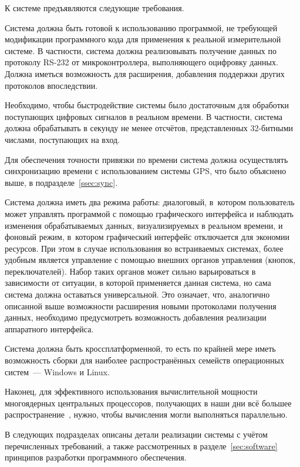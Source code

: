 \documentclass[a4paper, 14pt, titlepage]{extarticle}
\newcommand{\eng}[1]{\foreignlanguage{english}{#1}}
\begin{document}
  К системе предъявляются следующие требования.

  Система должна быть готовой к использованию программой, не требующей модификации программного кода
  для применения к реальной измерительной системе. В частности, система должна реализовывать
  получение данных по протоколу RS-232\cite{sweet-serial} от микроконтроллера, выполняющего оцифровку
  данных. Должна иметься возможность для расширения, добавления поддержки других протоколов впоследствии.

  Необходимо, чтобы быстродействие системы было достаточным для обработки поступающих цифровых
  сигналов в реальном времени. В частности, система должна обрабатывать в секунду не менее
   отсчётов, представленных 32-битными числами, поступающих на вход.

  Для обеспечения точности привязки по времени система должна осуществлять синхронизацию времени с
  использованием системы GPS, что было объяснено выше, в подразделе~\ref{ssec:sync}.

  Система должна иметь два режима работы: диалоговый, в~котором пользователь может управлять
  программой с помощью графического интерфейса и наблюдать изменения обрабатываемых данных,
  визуализируемых в реальном времени, и фоновый режим, в~котором графический интерфейс отключается
  для экономии ресурсов.
  При этом в случае использования во встраиваемых системах, более удобным является управление с
  помощью внешних органов управления (кнопок, переключателей). Набор таких органов может
  сильно варьироваться в зависимости от ситуации, в которой применяется данная система, но сама
  система должна оставаться универсальной. Это означает, что, аналогично описанной выше возможности
  расширения новыми протоколами получения данных, необходимо предусмотреть возможность добавления
  реализации аппаратного интерфейса.

  Система должна быть кроссплатформенной, то есть по крайней мере иметь возможность сборки для
  наиболее распространённых семейств операционных систем~--- \eng{Windows} и \eng{Linux}.

  Наконец, для эффективного использования вычислительной мощности многоядерных центральных
  процессоров, получающих в наши дни всё большее распространение~\cite{steam-hardware}, нужно, чтобы
  вычисления могли выполняться параллельно.

  В следующих подразделах описаны детали реализации системы с учётом перечисленных требований, а
  также рассмотренных в разделе~\ref{sec:software} принципов разработки программного обеспечения.
\end{document}
